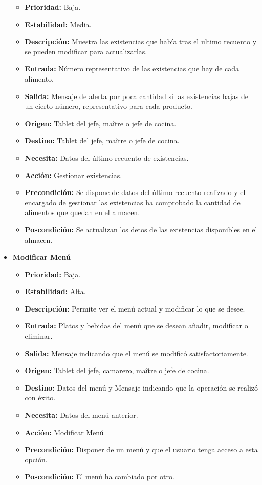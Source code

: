 \documentclass[spanish,a4paper,11pt, twoside]{report}	%
\begin{document}
\begin{itemize}
		\begin{itemize}
			\item \textbf{Prioridad: } Baja.
			\item \textbf{Estabilidad: } Media.
			\item \textbf{Descripción: } Muestra las existencias que había tras el ultimo recuento y se pueden modificar para actualizarlas.
			\item \textbf{Entrada: } Número representativo de las existencias que hay de cada alimento.
			\item \textbf{Salida: } Mensaje de alerta por poca cantidad si las existencias bajas de un cierto número, representativo para cada producto.
			\item \textbf{Origen: } Tablet del jefe, maître o jefe de cocina.
			\item \textbf{Destino: } Tablet del jefe, maître o jefe de cocina. 
			\item \textbf{Necesita: } Datos del último recuento de existencias.
			\item \textbf{Acción: } Gestionar existencias.
			\item \textbf{Precondición: } Se dispone de datos del último recuento realizado y el encargado de gestionar las existencias ha comprobado la cantidad de alimentos que quedan en el almacen.
			\item \textbf{Poscondición: } Se actualizan los detos de las existencias disponibles en el almacen.

		\end{itemize}%

		\item \textbf{Modificar Menú} %

		\begin{itemize}
			\item \textbf{Prioridad: } Baja.
			\item \textbf{Estabilidad: } Alta.
			\item \textbf{Descripción: } Permite ver el menú actual y modificar lo que se desee.
			\item \textbf{Entrada: } Platos y bebidas del menú que se desean añadir, modificar o eliminar.
			\item \textbf{Salida: } Mensaje indicando que el menú se modificó satisfactoriamente.
			\item \textbf{Origen: } Tablet del jefe, camarero, maître o jefe de cocina.
			\item \textbf{Destino: } Datos del menú y Mensaje indicando que la operación se realizó con éxito.
			\item \textbf{Necesita: } Datos del menú anterior.
			\item \textbf{Acción: } Modificar Menú
			\item \textbf{Precondición: } Disponer de un menú y que el usuario tenga acceso a esta opción.
			\item \textbf{Poscondición: } El menú ha cambiado por otro.


\end{itemize}
\end{itemize}
\end{document}
